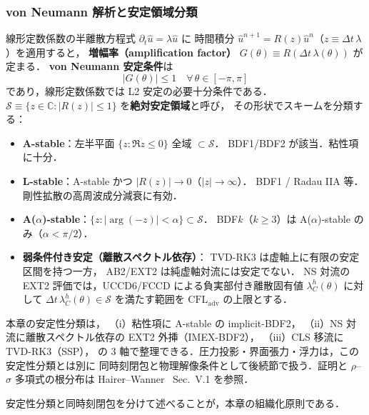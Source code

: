 \subsubsection*{von Neumann 解析と安定領域分類}
\label{sec:von_neumann}

線形定数係数の半離散方程式 $\partial_t \hat{u} = \lambda \hat{u}$ に
時間積分 $\hat{u}^{n+1} = R(z)\hat{u}^n$（$z\equiv\Delta t\,\lambda$）を適用すると，
\textbf{増幅率（amplification factor）} $G(\theta) \equiv R(\Delta t\,\lambda(\theta))$ が定まる．
\textbf{von Neumann 安定条件}は
\begin{equation}
  |G(\theta)| \le 1 \quad \forall\,\theta\in[-\pi,\pi]
  \label{eq:von_neumann_stability}
\end{equation}
であり，線形定数係数では L2 安定の必要十分条件である．
$\mathcal{S}\equiv\{z\in\mathbb{C}:|R(z)|\le 1\}$ を\textbf{絶対安定領域}と呼び，
その形状でスキームを分類する：
\begin{itemize}[leftmargin=2em]
  \item \textbf{A-stable}：左半平面 $\{z:\Re z\le 0\}$ 全域 $\subset\mathcal{S}$．
        BDF1/BDF2 が該当．粘性項に十分．
  \item \textbf{L-stable}：A-stable かつ $|R(z)|\to 0$（$|z|\to\infty$）．
        BDF1 / Radau IIA 等．剛性拡散の高周波成分減衰に有効．
  \item \textbf{A($\alpha$)-stable}：$\{z:|\arg(-z)|<\alpha\}\subset\mathcal{S}$．
        BDF$k$（$k\ge 3$）は A($\alpha$)-stable のみ（$\alpha<\pi/2$）．
  \item \textbf{弱条件付き安定（離散スペクトル依存）}：
        TVD-RK3 は虚軸上に有限の安定区間を持つ一方，
        AB2/EXT2 は純虚軸対流には安定でない．
        NS 対流の EXT2 評価では，UCCD6/FCCD による負実部付き離散固有値
        $\lambda_C^h(\theta)$ に対して
        $\Delta t\,\lambda_C^h(\theta)\in\mathcal{S}$ を満たす範囲を
        $\mathrm{CFL}_{\mathrm{adv}}$ の上限とする．
\end{itemize}
本章の安定性分類は，
（i）粘性項に A-stable の implicit-BDF2，
（ii）NS 対流に離散スペクトル依存の EXT2 外挿（IMEX-BDF2），
（iii）CLS 移流に TVD-RK3（SSP），
の 3 軸で整理できる．圧力投影・界面張力・浮力は，この安定性分類とは別に
同時刻閉包と物理解像条件として後続節で扱う．証明と $\rho$--$\sigma$ 多項式の根分布は
Hairer--Wanner~\cite{HairerWanner1996} Sec.~V.1 を参照．

安定性分類と同時刻閉包を分けて述べることが，本章の組織化原則である．

